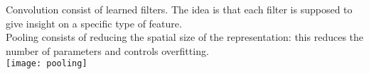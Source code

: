 Convolution consist of learned filters. The idea is that each filter is supposed to give insight on a specific type of feature. \\
Pooling consists of reducing the spatial size of the representation: this reduces the number of parameters and controls overfitting.\\
\texttt{[image: pooling]}
